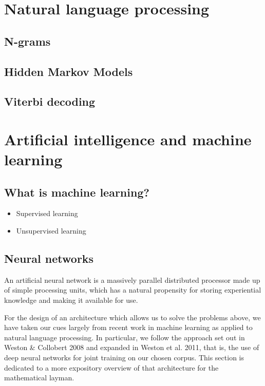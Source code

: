 \section{Natural language processing}
\label{sec:nlp}

\subsection{N-grams}
\label{sec:ngrams}

\subsection{Hidden Markov Models}
\label{sec:hmm-maxent}

\subsection{Viterbi decoding}
\label{sec:viterbi}

\section{Artificial intelligence and machine learning}
\label{sec:aiml}

\subsection{What is machine learning?}
\label{sec:statistics}
\begin{itemize}
\item Supervised learning
\item Unsupervised learning
\end{itemize}

\subsection{Neural networks}
\label{sec:neuralnetworks}

An artificial neural network is a massively parallel distributed
processor made up of simple processing units, which has a natural
propensity for storing experiential knowledge and making it available
for use.

For the design of an architecture which allows us to solve the
problems above, we have taken our cues largely from recent work in
machine learning as applied to natural language processing. In
particular, we follow the approach set out in Weston \& Collobert 2008
and expanded in Weston et al. 2011, that is, the use of deep neural
networks for joint training on our chosen corpus. This section is
dedicated to a more expository overview of that architecture for the
mathematical layman.

